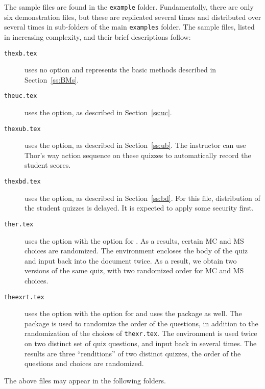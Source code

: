 \documentclass{article}
\begin{document}
The sample files are found in the \texttt{example} folder. Fundamentally,
there are only six demonstration files, but these are replicated several times
and distributed over several times in sub-folders of the main \texttt{examples} folder.
The sample files, listed in increasing complexity, and their brief descriptions follow:
\begin{description}
    \item[\texttt{thexb.tex}] uses no option and represents the basic
        methods described in Section~\ref{ss:BMs}.
    \item[\texttt{theuc.tex}] uses the  option, as described
        in Section~\ref{ss:uc}.
    \item[\texttt{thexub.tex}] uses the  option, as described
        in Section~\ref{ss:ub}. The instructor can use \textsf{Thor's way}
        action sequence on these quizzes to automatically record the
        student scores.
    \item[\texttt{thexbd.tex}]  uses the  option, as described
        in Section~\ref{ss:bd}. For this file, distribution of the student
        quizzes is delayed. It is expected to apply some security first.
    \item[\texttt{ther.tex}] uses the  option with the
         option for . As a results,
        certain MC and MS choices are randomized. The 
        environment encloses the body of the quiz and input back into the
        document twice. As a result, we obtain two versions of the same
        quiz, with two randomized order for MC and MS choices.
    \item[\texttt{theexrt.tex}] uses the  option with the
         option for  and uses the
         package as well. The  package is
        used to randomize the order of the questions, in addition to the
        randomization of the choices of \texttt{thexr.tex}. The
         environment is used twice on two distinct set of
        quiz questions, and input back in several times. The results are
        three ``renditions'' of two distinct quizzes, the order of the
        questions and choices are randomized.
\end{description}
The above files may appear in the following folders.
\end{document}
